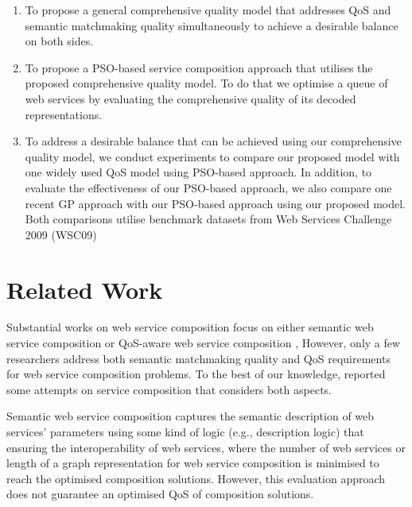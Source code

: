\documentclass{llncs}
\begin{document}
\begin{enumerate}
 \item To propose a general comprehensive quality model that addresses QoS and semantic matchmaking quality simultaneously to achieve a desirable balance on both sides.
  
 \item To propose a PSO-based service composition approach that utilises the proposed comprehensive quality model. To do that we optimise a queue of web services by evaluating the comprehensive quality of its decoded representations.
  
 \item To address a desirable balance that can be achieved using our comprehensive quality model, we conduct experiments to compare our proposed model with one widely used QoS model using PSO-based approach. In addition, to evaluate the effectiveness of our PSO-based approach,  we also compare one recent GP approach \cite{ma2015hybrid} with our PSO-based approach using our proposed model. Both comparisons utilise benchmark datasets from Web Services Challenge 2009 (WSC09) \cite{kona2009wsc} 
  
\end{enumerate}

\section{Related Work} \label{relatedWork}
Substantial works on web service composition focus on either semantic web service composition \cite{boustil2014semantic,bansal2016generalized,mier2015integrated} or QoS-aware web service composition \cite{gupta2015optimization,qi2010combining,ma2015hybrid,da2016particle,da2015graphevol,yu2013adaptive}, However, only a few researchers address both semantic matchmaking quality and QoS requirements for web service composition problems. To the best of our knowledge, \cite{fanjiang2014semantic,lecue2009optimizing,pop2009immune} reported some attempts on service composition that considers both aspects.

Semantic web service composition \cite{bansal2016generalized,boustil2014semantic,mier2015integrated} captures the semantic description of web services' parameters using some kind of logic (e.g., description logic) that ensuring the interoperability of web services, where the number of web services or length of a graph representation for web service composition is minimised to reach the optimised composition solutions. However, this evaluation approach does not guarantee an optimised QoS of composition solutions.
\end{document}
